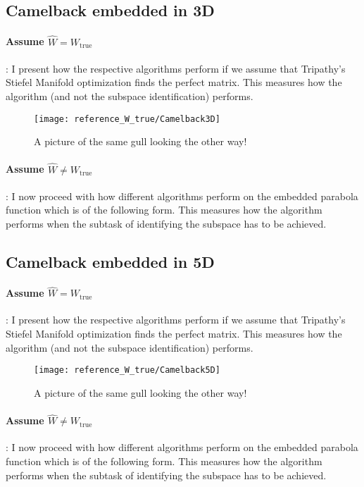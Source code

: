 \subsection{Camelback embedded in 3D}

\paragraph{Assume $\hat{W} = W_{\text{true}}$}: I present how the respective algorithms perform if we assume that Tripathy's Stiefel Manifold optimization finds the perfect matrix.
This measures how the algorithm (and not the subspace identification) performs.

\begin{figure}[H]
  \centering
      \texttt{[image: reference\_W\_true/Camelback3D]}
  \caption{A picture of the same gull looking the other way!}
\end{figure}

\paragraph{Assume $\hat{W} \neq W_{\text{true}}$}: I now proceed with how different algorithms perform on the embedded parabola function which is of the following form.
This measures how the algorithm performs when the subtask of identifying the subspace has to be achieved.

\subsection{Camelback embedded in 5D}

\paragraph{Assume $\hat{W} = W_{\text{true}}$}: I present how the respective algorithms perform if we assume that Tripathy's Stiefel Manifold optimization finds the perfect matrix.
This measures how the algorithm (and not the subspace identification) performs.

\begin{figure}[H]
  \centering
      \texttt{[image: reference\_W\_true/Camelback5D]}
  \caption{A picture of the same gull looking the other way!}
\end{figure}

\paragraph{Assume $\hat{W} \neq W_{\text{true}}$}: I now proceed with how different algorithms perform on the embedded parabola function which is of the following form.
This measures how the algorithm performs when the subtask of identifying the subspace has to be achieved.




